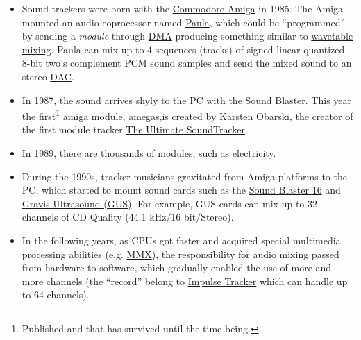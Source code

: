 \begin{itemize}
\item Sound trackers were born with the
  \href{http://en.wikipedia.org/wiki/Amiga}{Commodore Amiga} in
  1985. The Amiga mounted an audio coprocessor named
  \href{http://en.wikipedia.org/wiki/Original_Chip_Set}{Paula}, which
  could be ``programmed'' by sending a \emph{module} through
  \href{http://en.wikipedia.org/wiki/Direct_memory_access}{DMA}
  producing something similar to
  \href{http://en.wikipedia.org/wiki/Wavetable_synthesis}{wavetable
    mixing}. Paula can mix up to 4 sequences (tracks) of signed
  linear-quantized 8-bit two's complement PCM sound samples and send
  the mixed sound to an stereo
  \href{http://en.wikipedia.org/wiki/Digital-to-analog_converter}{DAC}.

\item In 1987, the sound arrives shyly to the PC with the
  \href{http://en.wikipedia.org/wiki/Sound_Blaster}{Sound
    Blaster}. This year
  \href{http://woolyss.com/tracking-trackers.php?s=Amiga}{the
    first\footnote{Published and that has survived until the time
      being.} amiga module},
  \href{http://modarchive.org/index.php?request=view_by_moduleid&query=33438}{amegas},is
  created by Karsten Obarski, the creator of the first module tracker
  \href{http://en.wikipedia.org/wiki/Ultimate_Soundtracker}{The
    Ultimate SoundTracker}.

\item In 1989, there are thousands of modules, such as
  \href{http://modarchive.org/index.php?request=view_by_moduleid&query=97751}{electricity}.

\item During the 1990s, tracker musicians gravitated from Amiga
  platforms to the PC, which started to mount sound cards such as the
  \href{http://en.wikipedia.org/wiki/Sound_Blaster_16}{Sound Blaster
    16} and
  \href{http://en.wikipedia.org/wiki/Gravis_Ultrasound}{Gravis
    Ultrasound (GUS)}. For example, GUS cards can mix up to 32
  channels of CD Quality (44.1 kHz/16 bit/Stereo).

\item In the following years, as CPUs got faster and acquired special
  multimedia processing abilities (e.g.
  \href{http://en.wikipedia.org/wiki/MMX\_\%28instruction_set\%29}{MMX}),
  the responsibility for audio mixing passed from hardware to
  software, which gradually enabled the use of more and more channels
  (the ``record'' belong to
  \href{http://en.wikipedia.org/wiki/Impulse_Tracker}{Impulse Tracker}
  which can handle up to 64 channels).


\end{itemize}
